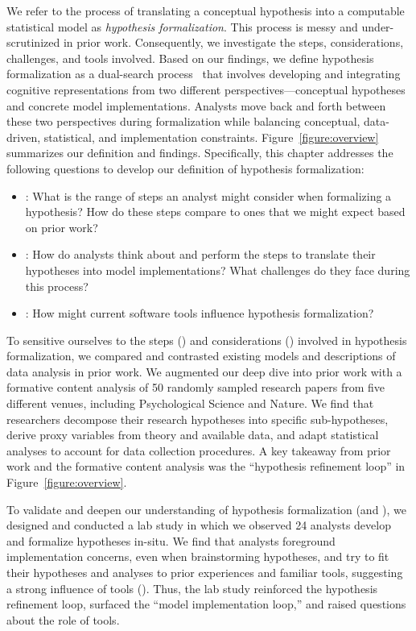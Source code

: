 We refer to the process of translating a conceptual hypothesis into a computable
statistical model as \textit{hypothesis formalization}. This process is  messy
and under-scrutinized in prior work. Consequently, we investigate the steps,
considerations, challenges, and tools involved. Based on our findings, we define
hypothesis formalization as a dual-search process~\cite{klahr1988dual} that
involves developing and integrating cognitive representations from two different
perspectives---conceptual hypotheses and concrete model implementations.
Analysts move back and forth between these two perspectives during formalization
while balancing conceptual, data-driven, statistical, and implementation
constraints. Figure~\ref{figure:overview} summarizes our definition and
findings. Specifically, this chapter addresses the following questions to
develop our definition of hypothesis formalization:
\begin{itemize}
    \item \rqSteps: What is the range of steps an analyst might consider when
    formalizing a hypothesis? How do these steps compare to ones that we might
    expect based on prior work?
    \item \rqProcess: How do analysts think about and perform the steps to
    translate their hypotheses into model implementations? What challenges do
    they face during this process?
    \item \rqTools: How might current software tools influence hypothesis
    formalization?
\end{itemize}

To sensitive ourselves to the steps (\rqSteps) and considerations (\rqProcess)
involved in hypothesis formalization, we compared and contrasted existing models
and descriptions of data analysis in prior work. We augmented our deep dive into
prior work with a formative content analysis of 50 randomly sampled research
papers from five different venues, including Psychological Science and Nature.
We find that researchers decompose their research hypotheses into specific
sub-hypotheses, derive proxy variables from theory and available data, and adapt
statistical analyses to account for data collection procedures. A key takeaway
from prior work and the formative content analysis was the ``hypothesis
refinement loop'' in Figure~\ref{figure:overview}. 

To validate and deepen our understanding of
hypothesis formalization (\rqSteps and \rqProcess), we designed and conducted a
lab study in which we observed 24 analysts develop and formalize hypotheses
in-situ. We find that analysts foreground implementation concerns, even when
brainstorming hypotheses, and try to fit their hypotheses and analyses to prior
experiences and familiar tools, suggesting a strong influence of tools
(\rqTools). Thus, the lab study reinforced the hypothesis refinement loop,
surfaced the ``model implementation loop,'' and raised questions about the role
of tools. 

